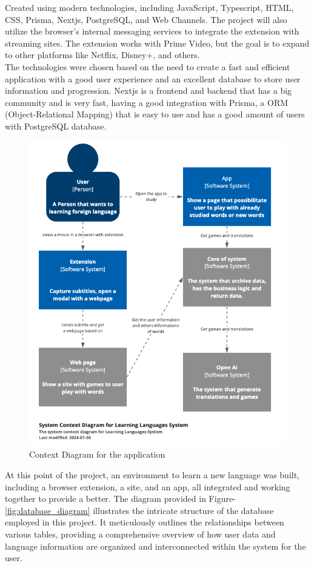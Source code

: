 \documentclass[12pt]{article}
\begin{document}
Created using modern technologies, including JavaScript, Typescript, HTML, CSS, Prisma, Nextjs, PostgreSQL, and Web Channels. The project will also utilize the browser's internal messaging services to integrate the extension with streaming sites. The extension works with Prime Video, but the goal is to expand to other platforms like Netflix, Disney+, and others. \\
The technologies were chosen based on the need to create a fast and efficient application with a good user experience and an excellent database to store user information and progression. Nextjs is a frontend and backend that has a big community and is very fast, having a good integration with Prisma, a ORM (Object-Relational Mapping) that is easy to use and has a good amount of users with PostgreSQL database. 

\begin{figure}[htbp]
\centering
\caption{
Context Diagram for the application
}
\label{fig:context_diagram}
\includegraphics[width=1\textwidth]{assets/4.png}
\end{figure}

At this point of the project, an environment to learn a new language was built, including a browser extension, a site, and an app, all integrated and working together to provide a better. The diagram provided in Figure-\ref{fig:database_diagram} illustrates the intricate structure of the database employed in this project. It meticulously outlines the relationships between various tables, providing a comprehensive overview of how user data and language information are organized and interconnected within the system for the user.
\end{document}
